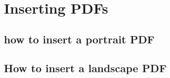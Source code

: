 \chapter{Inserting PDFs}\label{sec:motorSpecs}
  \section{how to insert a portrait PDF}
    
  \section{How to insert a landscape PDF}
    